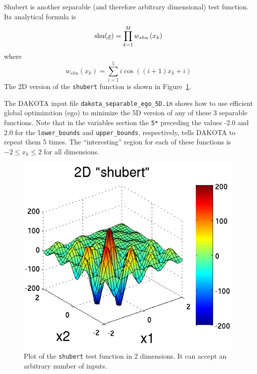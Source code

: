 Shubert is another separable (and therefore arbitrary dimensional) 
test function.  Its analytical formula is
\begin{displaymath}
{\rm shu}(\underline{x})=\prod_{k=1}^M w_{shu}\left(x_k\right)
\end{displaymath}
where 
\begin{displaymath}
w_{shu}\left(x_k\right)=\sum_{i=1}^5 i\cos((i+1)x_k+i)
\end{displaymath}
The 2D version of the \texttt{shubert} function is shown in 
Figure~\ref{fig:2D_shubert}. 

The DAKOTA input file \texttt{dakota\_separable\_ego\_5D.in} shows how
to use efficient global optimization (ego) to minimize the 5D version
of any of these 3 separable functions.  Note that in the variables
section the \texttt{5*} preceding the values -2.0 and 2.0 for the
\texttt{lower\_bounds} and \texttt{upper\_bounds}, respectively, tells
DAKOTA to repeat them 5 times. The ``interesting'' region for each 
of these functions is $-2\le x_k \le 2$ for all dimensions.
\begin{center}
  \begin{small}
    \begin{bigbox}
    \end{bigbox}
  \end{small}
\end{center}

\begin{figure}
  \centering
  \centerline{\includegraphics[scale=1.0]{images/DAK5pt2_2D_shubert}}
  \caption{Plot of the \texttt{shubert} test function in 2 dimensions.
           It can accept an arbitrary number of inputs.}
  \label{fig:2D_shubert}
\end{figure}

